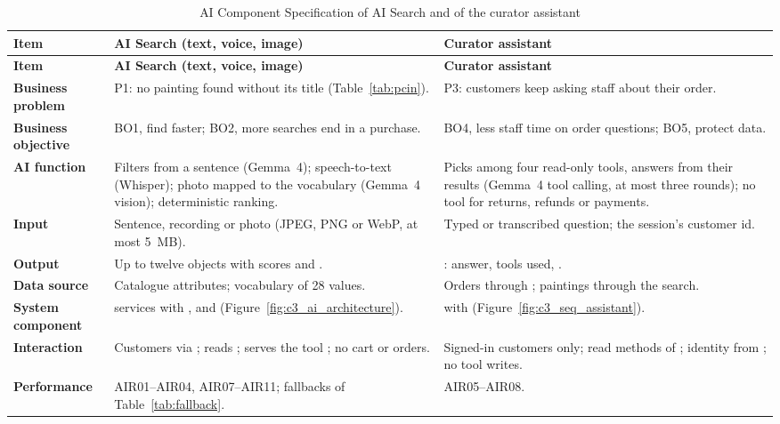 \begin{longtable}{@{}P{2.4cm}P{6.3cm}P{6.3cm}@{}}
\caption{AI Component Specification of AI Search and of the curator assistant}\label{tab:aispec}\\
\toprule
\textbf{Item} & \textbf{AI Search (text, voice, image)} & \textbf{Curator assistant}\\
\midrule
\endfirsthead
\toprule
\textbf{Item} & \textbf{AI Search (text, voice, image)} & \textbf{Curator assistant}\\
\midrule
\endhead
\small\textbf{Business problem} & \small P1: no painting found without its title (Table~\ref{tab:pcin}). & \small P3: customers keep asking staff about their order.\\
\small\textbf{Business objective} & \small BO1, find faster; BO2, more searches end in a purchase. & \small BO4, less staff time on order questions; BO5, protect data.\\
\small\textbf{AI function} & \small Filters from a sentence (Gemma~4); speech-to-text (Whisper); photo mapped to the vocabulary (Gemma~4 vision); deterministic ranking. & \small Picks among four read-only tools, answers from their results (Gemma~4 tool calling, at most three rounds); no tool for returns, refunds or payments.\\
\small\textbf{Input} & \small Sentence, recording or photo (JPEG, PNG or WebP, at most 5~MB). & \small Typed or transcribed question; the session's customer id.\\
\small\textbf{Output} & \small Up to twelve  objects with scores and . & \small {}: answer, tools used, .\\
\small\textbf{Data source} & \small Catalogue attributes; vocabulary of 28 values. & \small Orders through ; paintings through the search.\\
\small\textbf{System component} & \small {} services with ,  and  (Figure~\ref{fig:c3_ai_architecture}). & \small {} with  (Figure~\ref{fig:c3_seq_assistant}).\\
\small\textbf{Interaction} & \small Customers via ; reads ; serves the tool ; no cart or orders. & \small Signed-in customers only; read methods of ; identity from ; no tool writes.\\
\small\textbf{Performance} & \small AIR01--AIR04, AIR07--AIR11; fallbacks of Table~\ref{tab:fallback}. & \small AIR05--AIR08.\\

\end{longtable}
